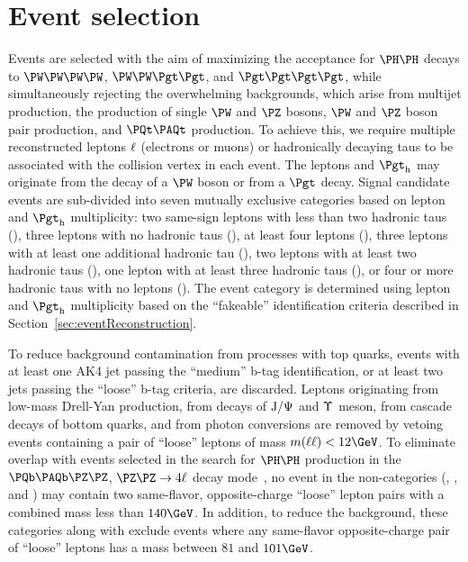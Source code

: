 \section{Event selection}
\label{sec:eventSelection}

Events are selected with the aim of maximizing the acceptance for $\HH$ decays to $\WWWW$, $\WWtt$, and
$\tttt$, while simultaneously rejecting the overwhelming backgrounds, which arise from multijet production, 
the production of single $\PW$ and $\PZ$ bosons, $\PW$ and $\PZ$ boson pair production, and $\ttbar$ production.  To achieve this, we require multiple
reconstructed leptons $\ell$ (electrons or muons) or hadronically decaying taus
\tauh to be associated with the collision vertex in each event.  The leptons and $\tauh$ may originate
from the decay of a $\PW$ boson or from a $\Pgt$ decay.  Signal candidate events
are sub-divided into seven mutually exclusive categories based on lepton and $\tauh$
multiplicity: two same-sign leptons with less than two hadronic taus (\llss),
three leptons with no hadronic taus (\lllnot), at least four leptons (\llll),
three leptons with at least one additional hadronic tau (\lllt), two
leptons with at least two hadronic taus (\lltt), one lepton with at least
three hadronic taus (\lttt), or four or more hadronic taus with no leptons (\noltttt).
The event category is determined using lepton and $\tauh$ multiplicity based on the
``fakeable'' identification criteria described in Section~\ref{sec:eventReconstruction}.

To reduce background contamination from processes with top quarks, events with
at least one AK4 jet passing the ``medium'' b-tag identification, or at least two
jets passing the ``loose'' b-tag criteria, are discarded. 
Leptons originating from low-mass Drell-Yan production, from decays of $\textrm{J}/\Psi$ and $\Upsilon$ meson,
from cascade decays of bottom quarks, and from photon conversions
are removed by vetoing events containing a pair of ``loose'' leptons of mass $m(\leplep) < 12\GeV$.
To eliminate overlap with events selected in the search for $\HH$ production in the $\Pbottom\APbottom\PZ\PZ$, $\PZ\PZ \to 4\Plepton$ decay mode~\cite{HIG-20-004}, no event in the
non-\tauh categories (\llss, \lllnot, and \llll) may contain two same-flavor,
opposite-charge ``loose'' lepton pairs with a combined mass less than $140\GeV$.
In addition, to reduce the \Zll background, these categories along with
\lltt exclude events where any same-flavor opposite-charge pair of ``loose''
leptons has a mass between $81$ and $101\GeV$.

